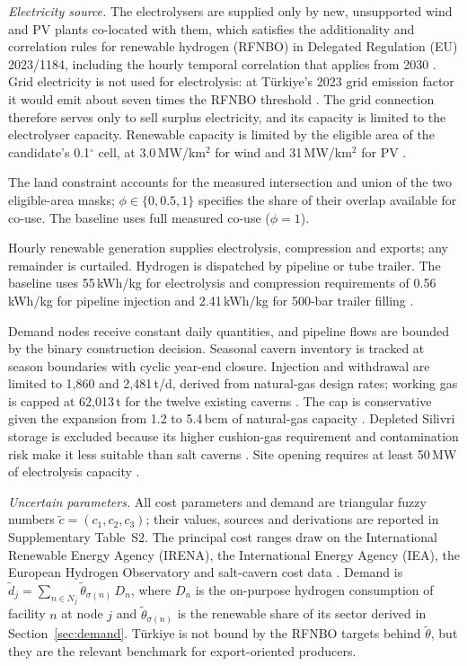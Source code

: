 \documentclass[preprint,12pt,authoryear]{elsarticle}
\begin{document}
\textit{Electricity source.} The electrolysers are supplied only by new, unsupported wind and PV plants co-located with them, which satisfies the additionality and correlation rules for renewable hydrogen (RFNBO) in Delegated Regulation (EU) 2023/1184, including the hourly temporal correlation that applies from 2030 \citep{eu2023da1184}. Grid electricity is not used for electrolysis: at Türkiye's 2023 grid emission factor \citep{menr2025ef} it would emit about seven times the RFNBO threshold \citep{eu2023da1185}. The grid connection therefore serves only to sell surplus electricity, and its capacity is limited to the electrolyser capacity. Renewable capacity is limited by the eligible area of the candidate's 0.1$^{\circ}$ cell, at 3.0\,MW/km$^2$ for wind \citep{denholm2009land} and 31\,MW/km$^2$ for PV \citep{ong2013land}.

The land constraint accounts for the measured intersection and union of the two eligible-area masks; $\phi\in\{0,0.5,1\}$ specifies the share of their overlap available for co-use. The baseline uses full measured co-use ($\phi=1$).

Hourly renewable generation supplies electrolysis, compression and exports; any remainder is curtailed. Hydrogen is dispatched by pipeline or tube trailer. The baseline uses 55\,kWh/kg for electrolysis \citep{doe2024record} and compression requirements of 0.56\,kWh/kg for pipeline injection and 2.41\,kWh/kg for 500-bar trailer filling \citep{desnz2023transport}.

Demand nodes receive constant daily quantities, and pipeline flows are bounded by the binary construction decision. Seasonal cavern inventory is tracked at season boundaries with cyclic year-end closure. Injection and withdrawal are limited to 1,860 and 2,481\,t/d, derived from natural-gas design rates; working gas is capped at 62,013\,t for the twelve existing caverns \citep{san2019tuz}. The cap is conservative given the expansion from 1.2 to 5.4\,bcm of natural-gas capacity \citep{aiib2018tuzgolu}. Depleted Silivri storage is excluded because its higher cushion-gas requirement and contamination risk make it less suitable than salt caverns \citep{baki2022botas}. Site opening requires at least 50\,MW of electrolysis capacity \citep{menr2023hydrogen}.

\textit{Uncertain parameters.} All cost parameters and demand are triangular fuzzy numbers $\tilde{c} = (c_1, c_2, c_3)$; their values, sources and derivations are reported in Supplementary Table~S2. The principal cost ranges draw on the International Renewable Energy Agency (IRENA), the International Energy Agency (IEA), the European Hydrogen Observatory and salt-cavern cost data \citep{irena2025costs,iea2024global,eho2025,papadias2021bulk}. Demand is $\tilde{d}_j = \sum_{n\in N_j}\tilde{\theta}_{\sigma(n)}\, D_n$, where $D_n$ is the on-purpose hydrogen consumption of facility $n$ at node $j$ and $\tilde{\theta}_{\sigma(n)}$ is the renewable share of its sector derived in Section~\ref{sec:demand}. Türkiye is not bound by the RFNBO targets behind $\tilde{\theta}$, but they are the relevant benchmark for export-oriented producers.
\end{document}
